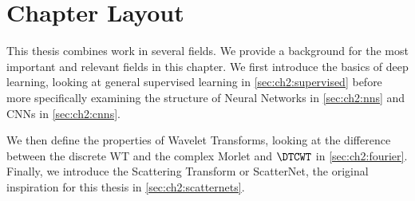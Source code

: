\section{Chapter Layout}
This thesis combines work in several fields. We provide a background for the
most important and relevant fields in this chapter. We first introduce the
basics of deep learning, looking at general supervised learning in \autoref{sec:ch2:supervised}
before more specifically examining the structure of Neural Networks
in \autoref{sec:ch2:nns} and CNNs in \autoref{sec:ch2:cnns}.

We then define the properties of Wavelet Transforms, looking at the difference
between the discrete WT and the complex Morlet and $\DTCWT$ in
\autoref{sec:ch2:fourier}.
Finally, we introduce the Scattering Transform or ScatterNet, the original
inspiration for this thesis in \autoref{sec:ch2:scatternets}.

